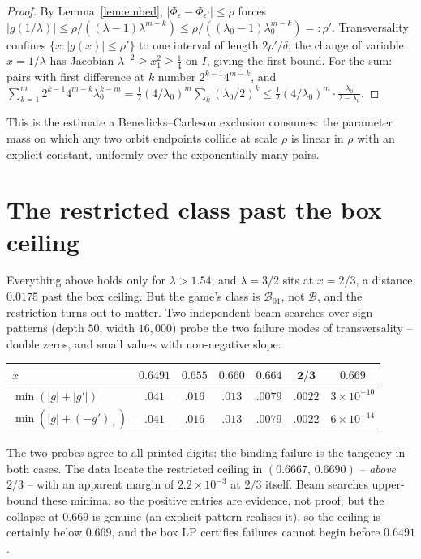 \documentclass[11pt]{amsart}
\theoremstyle{remark}\newtheorem{remark}[lemma]{Remark}
\begin{document}
\begin{proof}
By Lemma~\ref{lem:embed}, $|\Phi_\varepsilon-\Phi_{\varepsilon'}|\leq\rho$
forces $|g(1/\lambda)|\leq\rho/((\lambda-1)\lambda^{m-k})
\leq\rho/((\lambda_0-1)\lambda_0^{m-k})=:\rho'$. Transversality confines
$\{x:|g(x)|\leq\rho'\}$ to one interval of length $2\rho'/\delta$; the change
of variable $x=1/\lambda$ has Jacobian $\lambda^{-2}\geq x_1^2\geq\tfrac14$ on
$I$, giving the first bound. For the sum: pairs with first difference at $k$
number $2^{k-1}4^{m-k}$, and
$\sum_{k=1}^m2^{k-1}4^{m-k}\lambda_0^{k-m}
=\tfrac12(4/\lambda_0)^m\sum_k(\lambda_0/2)^k
\leq\tfrac12(4/\lambda_0)^m\cdot\frac{\lambda_0}{2-\lambda_0}$.
\end{proof}

This is the estimate a Benedicks--Carleson exclusion consumes: the parameter
mass on which any two orbit endpoints collide at scale $\rho$ is linear in
$\rho$ with an explicit constant, uniformly over the exponentially many pairs.

\section{The restricted class past the box ceiling}

Everything above holds only for $\lambda>1.54$, and $\lambda=3/2$ sits at
$x=2/3$, a distance $0.0175$ past the box ceiling. But the game's class is
$\mathcal B_{01}$, not $\mathcal B$, and the restriction turns out to matter.
Two independent beam searches over sign patterns (depth $50$, width $16{,}000$)
probe the two failure modes of transversality -- double zeros, and small
values with non-negative slope:

\begin{center}
\begin{tabular}{lcccccc}
\toprule
$x$ & $0.6491$ & $0.655$ & $0.660$ & $0.664$ & $\mathbf{2/3}$ & $0.669$\\
\midrule
$\min(|g|+|g'|)$ & $.041$ & $.016$ & $.013$ & $.0079$ & $\mathbf{.0022}$ &
$3\times10^{-10}$\\
$\min(|g|+(-g')_+ )$ & $.041$ & $.016$ & $.013$ & $.0079$ & $\mathbf{.0022}$ &
$6\times10^{-14}$\\
\bottomrule
\end{tabular}
\end{center}

The two probes agree to all printed digits: the binding failure is the
tangency in both cases. The data locate the restricted ceiling in
$(0.6667,\,0.6690)$ -- \emph{above} $2/3$ -- with an apparent margin of
$2.2\times10^{-3}$ at $2/3$ itself. Beam searches upper-bound these minima,
so the positive entries are evidence, not proof; but the collapse at $0.669$
is genuine (an explicit pattern realises it), so the ceiling is certainly
below $0.669$, and the box LP certifies failures cannot begin before
$0.6491$.
\end{document}
